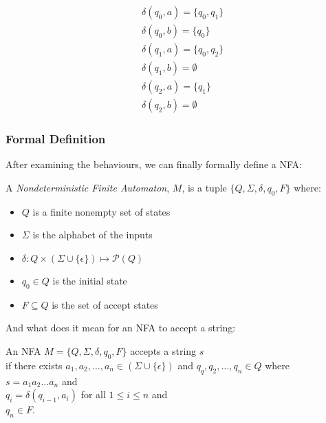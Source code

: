 \documentclass[11pt]{article}
\begin{document}
\begin{align*}
&\delta(q_0, a) = \{q_0,q_1\} \\
&\delta(q_0, b) = \{q_0\} \\
&\delta(q_1, a) = \{q_0,q_2\} \\
&\delta(q_1, b) = \emptyset \\
&\delta(q_2, a) = \{q_1\} \\
&\delta(q_2, b) = \emptyset
\end{align*}

\subsubsection{Formal Definition}

After examining the behaviours, we can finally formally define a NFA:
\begin{definition}
A \emph{Nondeterministic Finite Automaton}, $M$, is a tuple $\{Q,\Sigma,\delta,q_0,F\}$ where:
\begin{itemize}
\item $Q$ is a finite nonempty set of states
\item $\Sigma$ is the alphabet of the inputs
\item $\delta : Q \times (\Sigma \cup \{\epsilon\}) \mapsto \mathcal{P}(Q)$
\item $q_0 \in Q$ is the initial state
\item $F \subseteq Q$ is the set of accept states
\end{itemize}
\end{definition}

And what does it mean for an NFA to accept a string:
\begin{definition}
An NFA $M = \{Q,\Sigma,\delta,q_0,F\}$ accepts a string $s$ \\
if there exists
$a_1,a_2,\dots,a_n \in (\Sigma \cup \{\epsilon\})$ and
$q_q,q_2,\dots,q_n \in Q$ where \\
$s = a_1 a_2 \dots a_n$ and \\
$q_i = \delta(q_{i-1},a_i)$ for all $1 \leq i \leq n$ and \\
$q_n \in F$.
\end{definition}
\end{document}
